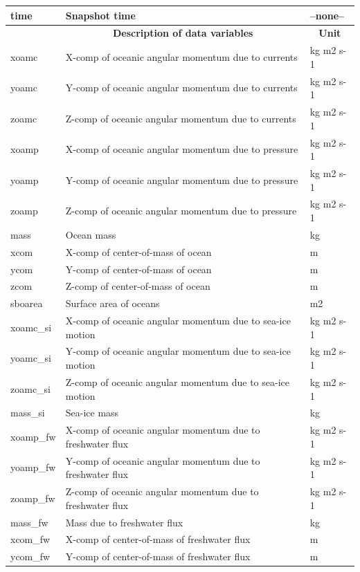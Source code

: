 \begin{longtable}{|m{}|m{}|m{}|}
time &Snapshot time &--none--  \\ \hline
\rowcolor{lightgray} \multicolumn{1}{|c|}{\textbf{Variables}} & \multicolumn{1}{|c|}{\textbf{Description of data variables}} &  \multicolumn{1}{|c|}{\textbf{Unit}}\\ \hline
xoamc &X-comp of oceanic angular momentum due to currents &kg m2 s-1  \\ \hline
yoamc &Y-comp of oceanic angular momentum due to currents &kg m2 s-1  \\ \hline
zoamc &Z-comp of oceanic angular momentum due to currents &kg m2 s-1  \\ \hline
xoamp &X-comp of oceanic angular momentum due to pressure &kg m2 s-1  \\ \hline
yoamp &Y-comp of oceanic angular momentum due to pressure &kg m2 s-1  \\ \hline
zoamp &Z-comp of oceanic angular momentum due to pressure &kg m2 s-1  \\ \hline
mass &Ocean mass &kg  \\ \hline
xcom &X-comp of center-of-mass of ocean &m  \\ \hline
ycom &Y-comp of center-of-mass of ocean &m  \\ \hline
zcom &Z-comp of center-of-mass of ocean &m  \\ \hline
sboarea &Surface area of oceans &m2  \\ \hline
xoamc\_si &X-comp of oceanic angular momentum due to sea-ice motion &kg m2 s-1  \\ \hline
yoamc\_si &Y-comp of oceanic angular momentum due to sea-ice motion &kg m2 s-1  \\ \hline
zoamc\_si &Z-comp of oceanic angular momentum due to sea-ice motion &kg m2 s-1  \\ \hline
mass\_si &Sea-ice mass &kg  \\ \hline
xoamp\_fw &X-comp of oceanic angular momentum due to freshwater flux &kg m2 s-1  \\ \hline
yoamp\_fw &Y-comp of oceanic angular momentum due to freshwater flux &kg m2 s-1  \\ \hline
zoamp\_fw &Z-comp of oceanic angular momentum due to freshwater flux &kg m2 s-1  \\ \hline
mass\_fw &Mass due to freshwater flux &kg  \\ \hline
xcom\_fw &X-comp of center-of-mass of freshwater flux &m  \\ \hline
ycom\_fw &Y-comp of center-of-mass of freshwater flux &m  \\ \hline

\end{longtable}
